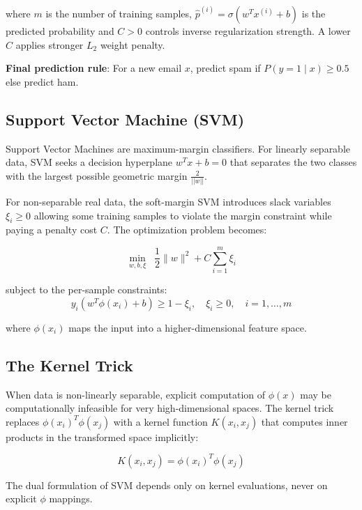 \documentclass[12pt,a4paper]{article}
\begin{document}
where $m$ is the number of training samples, $\hat{p}^{(i)} = \sigma(w^T x^{(i)} + b)$ is the predicted probability and $C > 0$ controls inverse regularization strength. A lower $C$ applies stronger $L_2$ weight penalty.

\textbf{Final prediction rule}: For a new email $x$, predict spam if $P(y=1 \mid x) \geq 0.5$ else predict ham.

\subsection{Support Vector Machine (SVM)}

Support Vector Machines are maximum-margin classifiers. For linearly separable data, SVM seeks a decision hyperplane $w^T x + b = 0$ that separates the two classes with the largest possible geometric margin $\frac{2}{||w||}$.

For non-separable real data, the soft-margin SVM introduces slack variables $\xi_i \geq 0$ allowing some training samples to violate the margin constraint while paying a penalty cost $C$. The optimization problem becomes:

\begin{equation}
\min_{w, b, \xi} \;\; \frac{1}{2} \|w\|^2 + C \sum_{i=1}^{m} \xi_i
\end{equation}

subject to the per-sample constraints:
\begin{equation}
y_i \left( w^T \phi(x_i) + b \right) \geq 1 - \xi_i, \quad \xi_i \geq 0, \quad i = 1, \ldots, m
\end{equation}

where $\phi(x_i)$ maps the input into a higher-dimensional feature space.

\subsection{The Kernel Trick}

When data is non-linearly separable, explicit computation of $\phi(x)$ may be computationally infeasible for very high-dimensional spaces. The kernel trick replaces $\phi(x_i)^T \phi(x_j)$ with a kernel function $K(x_i, x_j)$ that computes inner products in the transformed space implicitly:

\begin{equation}
K(x_i, x_j) = \phi(x_i)^T \phi(x_j)
\end{equation}

The dual formulation of SVM depends only on kernel evaluations, never on explicit $\phi$ mappings.
\end{document}
